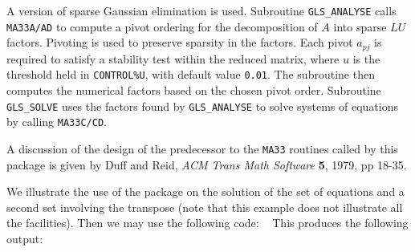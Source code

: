 \documentclass{galahad}
\newcommand{\packagename}{GLS}
\begin{document}

\galmethod

A version of sparse Gaussian elimination is used.
Subroutine {\tt \packagename\_ANALYSE} calls {\tt MA33A/AD}
to compute a pivot ordering for the decomposition of {$A$} into 
sparse $LU$ factors. Pivoting is used to preserve sparsity in the 
factors. Each pivot $a_{pj}$ is required to satisfy a stability test
\noindent within the reduced matrix, where $u$ is the threshold held in
{\tt CONTROL\%U}, with default value {\tt 0.01}.  The subroutine 
then computes the numerical factors based on the chosen pivot order.
Subroutine {\tt \packagename\_SOLVE} uses the factors found by 
{\tt \packagename\_ANALYSE} to solve systems of equations by 
calling {\tt MA33C/CD}.

A discussion of the design of the predecessor to the {\tt MA33} routines 
called by this package is given by 
Duff and Reid, {\it ACM Trans Math Software} {\bf 5},  1979, pp 18-35.



\galexample

We illustrate the use of the package on the solution of the 
set of equations 
and a second set
involving the transpose
(note that this example does not illustrate all the facilities). 
Then we may use the following code:
{\tt \small
\VerbatimInput{\packageexample}
}
\noindent
\noindent
This produces the following output:
{\tt \small
\VerbatimInput{\packageresults}
}
\noindent
\end{document}
